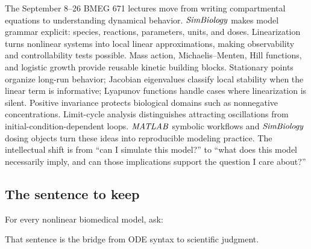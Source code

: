 \documentclass[a4paper]{article}
\newcommand{\MATLAB}{\ensuremath{\pksym{MATLAB}}}
\newcommand{\SimBio}{\ensuremath{\pksym{SimBiology}}}
\begin{document}
The September 8--26 BMEG 671 lectures move from writing compartmental equations to understanding dynamical behavior. \SimBio{} makes model grammar explicit: species, reactions, parameters, units, and doses. Linearization turns nonlinear systems into local linear approximations, making observability and controllability tests possible. Mass action, Michaelis--Menten, Hill functions, and logistic growth provide reusable kinetic building blocks. Stationary points organize long-run behavior; Jacobian eigenvalues classify local stability when the linear term is informative; Lyapunov functions handle cases where linearization is silent. Positive invariance protects biological domains such as nonnegative concentrations. Limit-cycle analysis distinguishes attracting oscillations from initial-condition-dependent loops. \MATLAB{} symbolic workflows and \SimBio{} dosing objects turn these ideas into reproducible modeling practice. The intellectual shift is from ``can I simulate this model?'' to ``what does this model necessarily imply, and can those implications support the question I care about?''

\subsection{The sentence to keep}

For every nonlinear biomedical model, ask:
\begin{center}
\end{center}
That sentence is the bridge from ODE syntax to scientific judgment.



\end{document}
